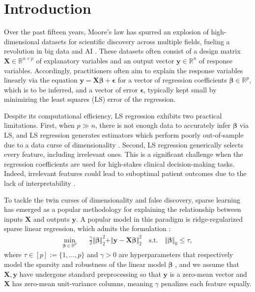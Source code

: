 \documentclass[mnsc,nonblindrev]{informs3} %
\begin{document}
\section{Introduction}\label{sec:intro}
Over the past fifteen years, Moore's law has spurred an %
explosion of high-dimensional datasets for scientific discovery across multiple fields, fueling a revolution in big data and AI \citep[][]{mcafee2012big, groves2016big, mcafee2023capitalize}. These datasets often consist of a design matrix $\bm{X} \in \mathbb{R}^{n \times p}$ of explanatory variables and an output vector $\bm{y} \in \mathbb{R}^n$ of response variables. Accordingly, practitioners often aim to explain the response variables linearly via the equation $\bm{y}=\bm{X}\bm{\beta}+\bm{\epsilon}$ for a vector of regression coefficients $\bm{\beta} \in \mathbb{R}^p$, which is to be inferred, and a vector of error $\bm{\epsilon}$, typically kept small by minimizing the least squares (LS) error of the regression. 

Despite its computational efficiency, LS regression exhibits two practical limitations. First, when $p \gg n$, there is not enough data to accurately infer $\bm{\beta}$ via LS, and LS regression generates estimators which perform poorly out-of-sample due to a data curse of dimensionality \citep[cf.][]{buhlmann2011statistics, gamarnik2022sparse}.
Second, LS regression generically selects every feature, including irrelevant ones. This is a significant challenge when the regression coefficients are used for high-stakes clinical decision-making tasks. Indeed, irrelevant features could lead to suboptimal patient outcomes due to the lack of interpretability \citep{doshi2017towards}.

To tackle the twin curses of dimensionality and false discovery, sparse learning has emerged as a popular methodology for explaining the relationship between inputs {\color{black}$\bm{X}$} and outputs {\color{black}$\bm{y}$}. %
A popular model in this paradigm is ridge-regularized sparse linear regression, which admits the formulation \citep[][]{bertsimas2020sparse,xie2020scalable, atamturk2020safe}:
\begin{align}\label{eqn:l0l2_training}
    \min_{\bm{\beta} \in \mathbb{R}^p} \quad &  \frac{\gamma}{2} \Vert \bm{\beta}\Vert_2^2+\Vert \bm{y}-\bm{X}\bm{\beta}\Vert_2^2  \quad \text{s.t.} \quad \Vert \bm{\beta}\Vert_0 \leq \tau,
\end{align} 
where $\tau \in [p]:=\{1, \ldots, p\}$ and $\gamma >0$ are hyperparameters that respectively model the sparsity and robustness of the linear model $\bm{\beta}$ \citep[cf.][]{xu2008robust, bertsimas2018characterization}, and we assume %
that $\bm{X}, \bm{y}$ have undergone standard preprocessing so that $\bm{y}$ is a zero-mean vector and $\bm{X}$ has zero-mean unit-variance columns, meaning $\gamma$ penalizes each feature equally.
\end{document}
